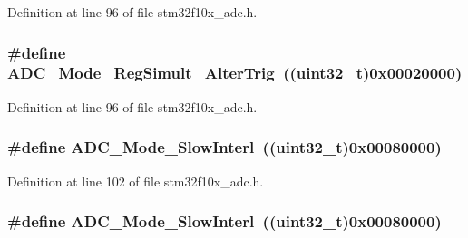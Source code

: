 Definition at line 96 of file stm32f10x\+\_\+adc.\+h.

\subsubsection[{\texorpdfstring{A\+D\+C\+\_\+\+Mode\+\_\+\+Reg\+Simult\+\_\+\+Alter\+Trig}{ADC_Mode_RegSimult_AlterTrig}}]{\setlength{\rightskip}{0pt plus 5cm}\#define A\+D\+C\+\_\+\+Mode\+\_\+\+Reg\+Simult\+\_\+\+Alter\+Trig~(({\bf uint32\+\_\+t})0x00020000)}\hypertarget{group___a_d_c__mode_gae3d5fbf93f60d75534364bf9db78f632}{}\label{group___a_d_c__mode_gae3d5fbf93f60d75534364bf9db78f632}


Definition at line 96 of file stm32f10x\+\_\+adc.\+h.

\subsubsection[{\texorpdfstring{A\+D\+C\+\_\+\+Mode\+\_\+\+Slow\+Interl}{ADC_Mode_SlowInterl}}]{\setlength{\rightskip}{0pt plus 5cm}\#define A\+D\+C\+\_\+\+Mode\+\_\+\+Slow\+Interl~(({\bf uint32\+\_\+t})0x00080000)}\hypertarget{group___a_d_c__mode_ga8b81e27e98dbc3d1e31452dbad167cd5}{}\label{group___a_d_c__mode_ga8b81e27e98dbc3d1e31452dbad167cd5}


Definition at line 102 of file stm32f10x\+\_\+adc.\+h.

\subsubsection[{\texorpdfstring{A\+D\+C\+\_\+\+Mode\+\_\+\+Slow\+Interl}{ADC_Mode_SlowInterl}}]{\setlength{\rightskip}{0pt plus 5cm}\#define A\+D\+C\+\_\+\+Mode\+\_\+\+Slow\+Interl~(({\bf uint32\+\_\+t})0x00080000)}\hypertarget{group___a_d_c__mode_ga8b81e27e98dbc3d1e31452dbad167cd5}{}\label{group___a_d_c__mode_ga8b81e27e98dbc3d1e31452dbad167cd5}


